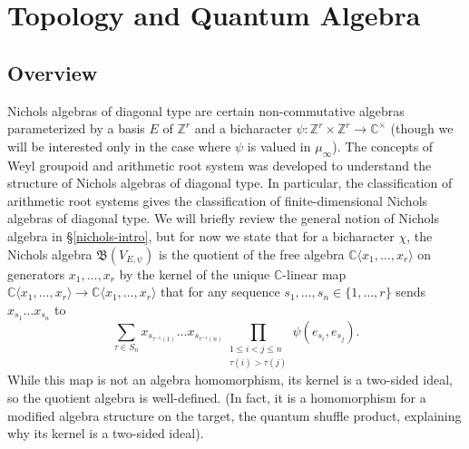 \documentclass[11pt,letterpaper]{article}
\theoremstyle{definition}
\theoremstyle{remark}
\numberwithin{equation}{section}
\theoremstyle{dotless}
\newcommand{\hchi}{\psi} %
\begin{document}
\section{Topology and Quantum Algebra} \label{SectionTopology}

\subsection{Overview}


Nichols algebras of diagonal type are certain non-commutative algebras parameterized by a basis $E$ of $\mathbb Z^r$ and a bicharacter $\hchi \colon \mathbb Z^r \times \mathbb Z^r \to \mathbb C^\times$ (though we will be interested only in the case where $\hchi$ is valued in $\mu_\infty$). The concepts of Weyl groupoid and arithmetic root system was developed to understand the structure of Nichols algebras of diagonal type. In particular, the classification of arithmetic root systems gives the classification of finite-dimensional Nichols algebras of diagonal type. We will briefly review the general notion of Nichols algebra in \S\ref{nichols-intro}, but for now we state that for a bicharacter $\chi$, the Nichols algebra $\mathfrak{B} (V_{E,\hchi})$ is the quotient of the free algebra $\mathbb C \langle x_1,\dots, x_r \rangle$ on generators $x_1,\dots, x_r$ by the kernel of the unique $\mathbb C$-linear map $\mathbb C \langle x_1,\dots, x_r \rangle\to \mathbb C \langle x_1,\dots, x_r \rangle$ that for any sequence $s_1,\dots,s_n \in \{1,\dots,r\}$ sends $x_{s_1} \dots x_{s_n}$ to \[ \sum_{\tau \in S_n}    x_{s_{\tau^{-1}(1)}}  \dots  x_{s_{\tau^{-1}(n)}}\prod_{\substack{ 1\leq i < j \leq n \\ \tau(i)>\tau(j)}} \hchi( e_{s_i}, e_{s_j}) .\]
While this map is not an algebra homomorphism, its kernel is a two-sided ideal, so the quotient algebra is well-defined. (In fact, it is a homomorphism for a modified algebra structure on the target, the quantum shuffle product, explaining why its kernel is a two-sided ideal).
\end{document}
